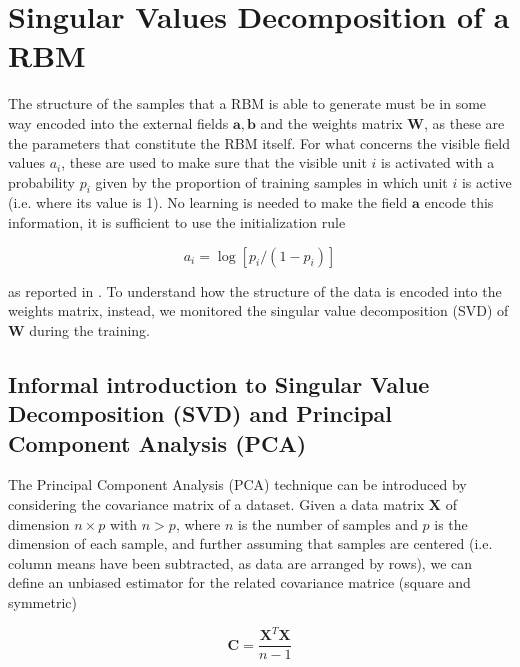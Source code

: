 \documentclass{revtex4-1}
\begin{document}
\section{Singular Values Decomposition of a RBM}
The structure of the samples that a RBM  is able to generate must be in some way encoded into the external fields \(\mathbf{a},\mathbf{b}\) and the weights matrix \(\mathbf{W}\), as these are the parameters that constitute the RBM itself. For what concerns the visible field values \(a_i\), these are used to make sure that the visible unit \(i\) is activated with a probability \(p_i\) given by the proportion of training samples in which unit \(i\) is active (i.e. where its value is 1). No learning is needed to make the field \(\mathbf{a}\) encode this information, it is sufficient to use the initialization rule

\begin{equation}
a_i = \log[p_i/(1-p_i)]
\label{eq:bias_init}
\end{equation}

as reported in \cite{Hinton_guide}. To understand how the structure of the data is encoded into the weights matrix, instead, we monitored the singular value decomposition (SVD) of \(\mathbf{W}\) during the training.

\subsection{Informal introduction to Singular Value Decomposition (SVD) and Principal Component Analysis (PCA)} \label{sec:svd_pca}

The Principal Component Analysis (PCA) technique can be introduced by considering the covariance matrix of a dataset. Given a data matrix \(\mathbf{X}\) of dimension \(n \times p\) with \(n > p\), where \(n\) is the number of samples and \(p\) is the dimension of each sample, and further assuming that samples are centered (i.e. column means have been subtracted, as data are arranged by rows), we can define an unbiased estimator for the related covariance matrice (square and symmetric)


\begin{equation}
\mathbf{C} = \frac{\mathbf{X}^T \mathbf{X}}{n-1}
\end{equation}
\end{document}
